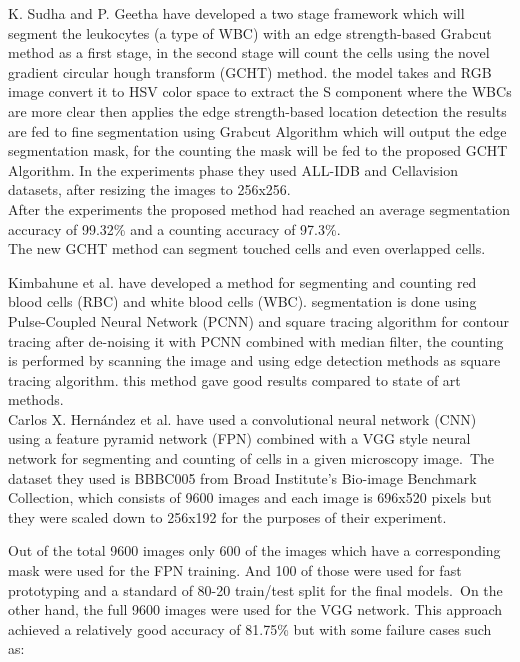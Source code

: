 \documentclass[conference]{IEEEtran}
\begin{document}
K. Sudha and P. Geetha \cite{SUDHA2020639} have developed a two stage framework which will segment the leukocytes (a type of WBC) with an edge strength-based Grabcut method as a first stage, in the second stage will count the cells using the novel gradient circular hough transform (GCHT) method. the model takes and RGB image convert it to HSV color space to extract the S component where the WBCs are more clear then applies the edge strength-based location detection the results are fed to fine segmentation using Grabcut Algorithm which will output the edge segmentation mask, for the counting the mask will be fed to the proposed GCHT Algorithm. In the experiments phase they used ALL-IDB \cite{labati2011all} and Cellavision \cite{Zheng2018} datasets, after resizing the images to 256x256.\\
After the experiments the proposed method had reached an average segmentation accuracy of 99.32\% and a counting accuracy of 97.3\%.\\
The new GCHT method can segment touched cells and even overlapped cells.

Kimbahune et al. \cite{kimbahune2011blood} have developed a method for segmenting and counting red blood cells (RBC) and white blood cells (WBC).
segmentation is done using Pulse-Coupled Neural Network (PCNN) and square tracing algorithm for contour tracing after de-noising it with PCNN combined with median filter, the counting is performed by scanning the image and using edge detection methods as square tracing algorithm. this method gave good results compared to state of art methods.\\

Carlos X. Hern{\'{a}}ndez et al. \cite{DBLP:journals/corr/abs-1802-10548} have used a convolutional neural network (CNN) using a feature pyramid network (FPN) combined with a VGG style neural network for segmenting and counting of cells in a given microscopy image.\
The dataset they used is BBBC005 \cite{ljosa2012annotated} from Broad Institute's Bio-image Benchmark Collection, which consists of 9600 images and each image is 696x520 pixels but they were scaled down to 256x192 for the purposes of their experiment.\

Out of the total 9600 images only 600 of the images which have a corresponding mask were used for the FPN training. And 100 of those were used for fast prototyping and a standard of 80-20 train/test split for the final models.\
On the other hand, the full 9600 images were used for the VGG network.
This approach achieved a relatively good accuracy of 81.75\% but with some failure cases such as:\
\end{document}
